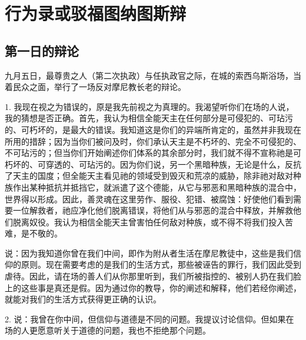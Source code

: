 
\chapter{行为录或驳福图纳图斯辩}



\section{第一日的辩论}

九月五日，最尊贵之人（第二次执政）与任执政官之际，在城的索西乌斯浴场，当着民众之面，举行了一场反对摩尼教长老的辩论。\par

1. 我现在视之为错误的，原是我先前视之为真理的。我渴望听你们在场的人说，我的猜想是否正确。首先，我认为相信全能天主在任何部分是可侵犯的、可玷污的、可朽坏的，是最大的错误。我知道这是你们的异端所肯定的，虽然并非我现在所用的措辞；因为当你们被问及时，你们承认天主是不朽坏的、完全不可侵犯的、不可玷污的；但当你们开始阐述你们体系的其余部分时，我们就不得不宣称祂是可朽坏的、可穿透的、可玷污的。因为你们说，另一个黑暗种族，无论是什么，反抗了天主的国度；但全能天主看见祂的领域受到毁灭和荒凉的威胁，除非祂对敌对种族作出某种抵抗并抵挡它，就派遣了这个德能，从它与邪恶和黑暗种族的混合中，世界得以形成。因此，善灵魂在这里劳作、服役、犯错、被腐蚀：好使他们看到需要一位解救者，祂应净化他们脱离错误，将他们从与邪恶的混合中释放，并解救他们脱离奴役。我认为相信全能天主曾害怕任何敌对种族，或不得不将我们投入苦难，是不敬的。\par

说：因为我知道你曾在我们中间，即作为附从者生活在摩尼教徒中，这些是我们信仰的原则。现在需要考虑的是我们的生活方式，那些被诬告的罪行，我们因此受到虐待。因此，请在场的善人们从你那里听到，我们所被指控的、被别人扔在我们脸上的这些事是真还是假。因为通过你的教导，你的阐述和解释，他们若经你阐述，就能对我们的生活方式获得更正确的认识。\par

2. 说：我曾在你中间，但信仰与道德是不同的问题。我提议讨论信仰。但如果在场的人更愿意听关于道德的问题，我也不拒绝那个问题。\par

